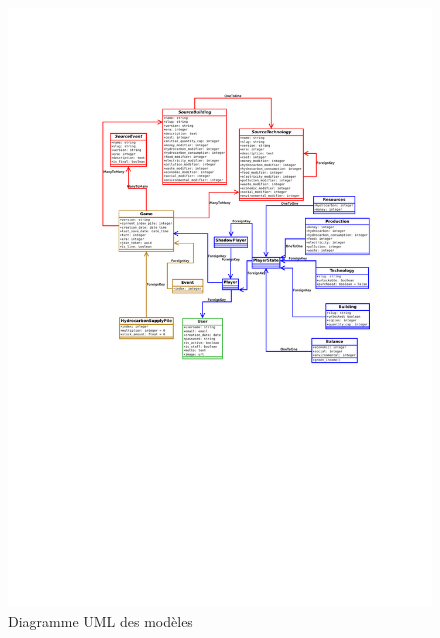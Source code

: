 \documentclass[12pt,twoside,a4paper]{article}
\begin{document}
\begin{figure}[H]
\centering
\includegraphics[width=15cm]{../global_uml.pdf}
\caption{Diagramme UML des mod\`eles}
\end{figure}
\end{document}
